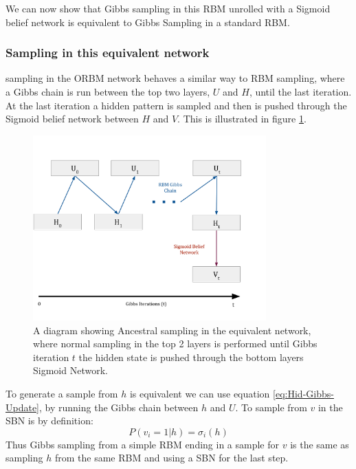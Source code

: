 We can now show that Gibbs sampling in this RBM unrolled with a Sigmoid belief network is equivalent to Gibbs Sampling in a standard RBM.\@

\subsubsection{Sampling in this equivalent network}

sampling in the ORBM  network behaves a similar way to RBM sampling, where a Gibbs chain is run between the top two layers, $U$ and $H$, until the last iteration. At the last iteration a hidden pattern is sampled and then is pushed through the Sigmoid belief network between $H$ and $V$. This is illustrated in figure \ref{F:3-Layer-RBM-Gibbs}.

\begin{figure}[h]
\begin{center}
  \includegraphics[width = 0.8\textwidth]{Assets/ORBM-Gibbs-Chain.png}
\caption{A diagram showing Ancestral sampling in the equivalent network, where normal sampling in the top 2 layers is performed until Gibbs iteration $t$ the hidden state is pushed through the bottom layers Sigmoid Network.}
\label{F:3-Layer-RBM-Gibbs}
\end{center}
\end{figure}

To generate a sample from $h$ is equivalent we can use equation \ref{eq:Hid-Gibbs-Update}, by running the Gibbs chain between $h$ and $U$. To sample from $v$ in the SBN is by definition:
$$
P(v_i = 1|h) = \sigma_i(h)
$$
Thus Gibbs sampling from a simple RBM ending in a sample for $v$ is the same as sampling $h$ from the same RBM and using a SBN for the last step.

